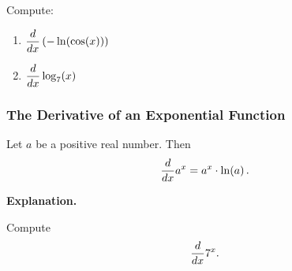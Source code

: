 \documentclass[10pt,t,presentation,ignorenonframetext,aspectratio=169]{beamer}
\begin{document}
\begin{frame}
  \vs
  \question{} Compute:
  \begin{enumerate}
  \item $\displaystyle \frac{d}{\mathop{}\!d x} \left(-\ln(\cos(x))\right)$ \vfill
  \item $\displaystyle \frac{d}{\mathop{}\!d x} \log_7 (x)$ \vfill
  \end{enumerate}
\end{frame}

\begin{frame}
  \frametitle{The Derivative of an Exponential Function}
  \begin{thm}
    Let $a$ be a positive real number. Then
    \[
      \frac{d}{\mathop{}\!d x} a^x = a^x\cdot \ln(a) \,.
    \]
  \end{thm}
  \vs
  \textbf{Explanation.}
\end{frame}

\begin{frame}
  \vs
  \question{} Compute
  \[
    \frac{d}{\mathop{}\!d x} 7^x.
  \]
\end{frame}
\end{document}
